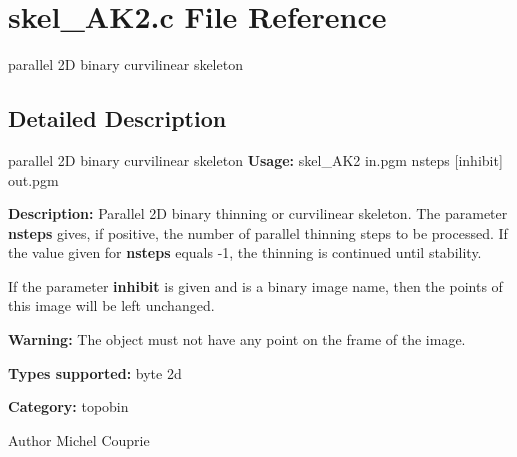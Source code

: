 \section{skel\_\-AK2.c File Reference}
\label{skel__AK2_8c}


parallel 2D binary curvilinear skeleton  




\subsection{Detailed Description}
parallel 2D binary curvilinear skeleton {\bfseries Usage:} skel\_\-AK2 in.pgm nsteps [inhibit] out.pgm

{\bfseries Description:} Parallel 2D binary thinning or curvilinear skeleton. The parameter {\bfseries nsteps} gives, if positive, the number of parallel thinning steps to be processed. If the value given for {\bfseries nsteps} equals -\/1, the thinning is continued until stability.

If the parameter {\bfseries inhibit} is given and is a binary image name, then the points of this image will be left unchanged.

{\bfseries Warning:} The object must not have any point on the frame of the image.

{\bfseries Types supported:} byte 2d

{\bfseries Category:} topobin

\begin{DoxyAuthor}{Author}
Michel Couprie 
\end{DoxyAuthor}
